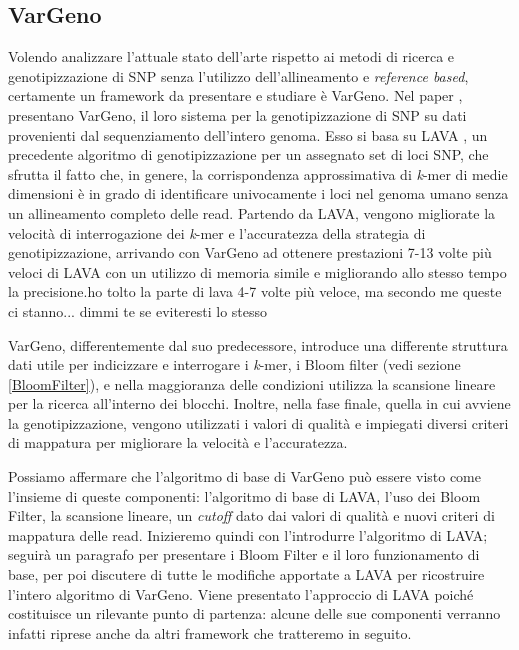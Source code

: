 \documentclass[../main.tex]{subfiles}
\begin{document}
\subsection{VarGeno}
\label{vargeno}
Volendo analizzare l'attuale stato dell'arte rispetto ai metodi di ricerca e genotipizzazione di SNP senza l'utilizzo dell'allineamento e \textit{reference based}, certamente un framework da presentare e studiare è VarGeno. Nel paper \cite{sun-medvedev2018vargeno}, presentano VarGeno, il loro sistema per la genotipizzazione di SNP su dati provenienti dal sequenziamento dell'intero genoma. Esso si basa su LAVA \cite{shajii2016lava}, un precedente algoritmo di genotipizzazione per un assegnato set di loci SNP, che sfrutta il fatto che, in genere, la corrispondenza approssimativa di \textit{k}-mer di medie dimensioni è in grado di identificare univocamente i loci nel genoma umano senza un allineamento completo delle read. \textcolor{BurntOrange}{Partendo da LAVA, vengono migliorate la velocità di interrogazione dei \textit{k}-mer e l'accuratezza della strategia di genotipizzazione, arrivando con VarGeno ad ottenere prestazioni 7-13 volte più veloci di LAVA con un utilizzo di memoria simile e migliorando allo stesso tempo la precisione.}\textcolor{OliveGreen}{ho tolto la parte di lava 4-7 volte più veloce, ma secondo me queste ci stanno... dimmi te se eviteresti lo stesso}

VarGeno, differentemente dal suo predecessore, introduce una differente struttura dati utile per indicizzare e interrogare i \textit{k}-mer, i Bloom filter (vedi sezione \ref{BloomFilter}), e nella maggioranza delle condizioni utilizza la scansione lineare per la ricerca all'interno dei blocchi. Inoltre, nella fase finale, quella in cui avviene la genotipizzazione, vengono utilizzati i valori di qualità e impiegati diversi criteri di mappatura per migliorare la velocità e l'accuratezza. 

Possiamo affermare che l'algoritmo di base di VarGeno può essere visto come l'insieme di queste componenti: l'algoritmo di base di LAVA, l'uso dei Bloom Filter, la scansione lineare, un \textit{cutoff} dato dai valori di qualità e nuovi criteri di mappatura delle read. Inizieremo quindi con l'introdurre l'algoritmo di LAVA; seguirà un paragrafo per presentare i Bloom Filter e il loro funzionamento di base, per poi discutere di tutte le modifiche apportate a LAVA per ricostruire l'intero algoritmo di VarGeno. Viene presentato l'approccio di LAVA poiché costituisce un rilevante punto di partenza: alcune delle sue componenti verranno infatti riprese anche da altri framework che tratteremo in seguito.
\end{document}
